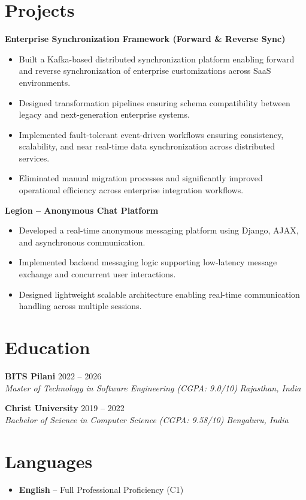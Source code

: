 \documentclass[11pt,a4paper]{article}
\newcommand{\resumeSubheading}[4]{
  \textbf{#1} \hfill #2 \\
  \textit{#3} \hfill \textit{#4}
}
\begin{document}
\section*{Projects}

\textbf{Enterprise Synchronization Framework (Forward \& Reverse Sync)}

\vspace{3pt}
\begin{itemize}[leftmargin=*, itemsep=2pt, topsep=0pt]
    \item Built a Kafka-based distributed synchronization platform enabling forward and reverse synchronization of enterprise customizations across SaaS environments.
    \item Designed transformation pipelines ensuring schema compatibility between legacy and next-generation enterprise systems.
    \item Implemented fault-tolerant event-driven workflows ensuring consistency, scalability, and near real-time data synchronization across distributed services.
    \item Eliminated manual migration processes and significantly improved operational efficiency across enterprise integration workflows.
\end{itemize}

\vspace{8pt}

\textbf{Legion -- Anonymous Chat Platform}

\vspace{3pt}
\begin{itemize}[leftmargin=*, itemsep=2pt, topsep=0pt]
    \item Developed a real-time anonymous messaging platform using Django, AJAX, and asynchronous communication.
    \item Implemented backend messaging logic supporting low-latency message exchange and concurrent user interactions.
    \item Designed lightweight scalable architecture enabling real-time communication handling across multiple sessions.
\end{itemize}

\section*{Education}

\resumeSubheading
{BITS Pilani}{2022 -- 2026}
{Master of Technology in Software Engineering (CGPA: 9.0/10)}{Rajasthan, India}

\vspace{8pt}

\resumeSubheading
{Christ University}{2019 -- 2022}
{Bachelor of Science in Computer Science (CGPA: 9.58/10)}{Bengaluru, India}

\section*{Languages}
\begin{itemize}[leftmargin=*, itemsep=2pt, topsep=0pt]
    \item \textbf{English} -- Full Professional Proficiency (C1)
\end{itemize}
\end{document}
